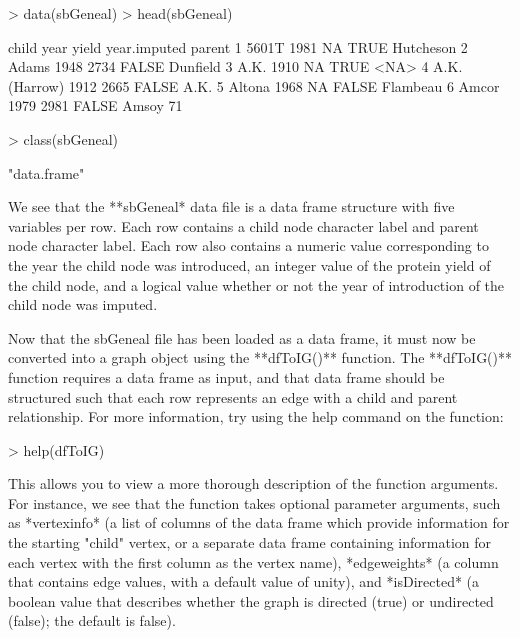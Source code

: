 \documentclass{article}
\numberwithin{equation}{section} %
\begin{document}
\begin{Schunk}
\begin{Sinput}
> data(sbGeneal)
> head(sbGeneal)
\end{Sinput}
\begin{Soutput}
          child year yield year.imputed    parent
1         5601T 1981    NA         TRUE Hutcheson
2         Adams 1948  2734        FALSE  Dunfield
3          A.K. 1910    NA         TRUE      <NA>
4 A.K. (Harrow) 1912  2665        FALSE      A.K.
5        Altona 1968    NA        FALSE  Flambeau
6         Amcor 1979  2981        FALSE  Amsoy 71
\end{Soutput}
\begin{Sinput}
> class(sbGeneal)
\end{Sinput}
\begin{Soutput}
[1] "data.frame"
\end{Soutput}
\end{Schunk}

We see that the **sbGeneal* data file is a data frame structure with five variables per row. Each row contains a child node character label and parent node character label. Each row also contains a numeric value corresponding to the year the child node was introduced, an integer value of the protein yield of the child node, and a logical value whether or not the year of introduction of the child node was imputed.

Now that the sbGeneal file has been loaded as a data frame, it must now be converted into a graph object using the **dfToIG()** function. The **dfToIG()** function requires a data frame as input, and that data frame should be structured such that each row represents an edge with a child and parent relationship. For more information, try using the help command on the function:

\begin{Schunk}
\begin{Sinput}
> help(dfToIG)
\end{Sinput}
\end{Schunk}

This allows you to view a more thorough description of the function arguments. For instance, we see that the function takes optional parameter arguments, such as *vertexinfo* (a list of columns of the data frame which provide information for the starting "child" vertex, or a separate data frame containing information for each vertex with the first column as the vertex name), *edgeweights* (a column that contains edge values, with a default value of unity), and *isDirected* (a boolean value that describes whether the graph is directed (true) or undirected (false); the default is false).
\end{document}
